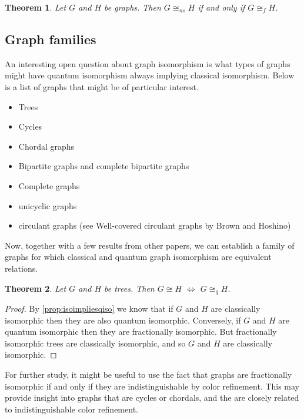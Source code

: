 \documentclass[12pt]{article}
\newtheorem{thm}{Theorem}[section]
\begin{document}
\begin{thm}
Let $G$ and $H$ be graphs. Then $G \cong_{ns} H$ if and only if $G \cong_f H$.
\end{thm}

\subsection{Graph families}
An interesting open question about graph isomorphism is what types of graphs might have quantum isomorphism always implying classical isomorphism. Below is a list of graphs that might be of particular interest.
\begin{itemize}
\item Trees
\item Cycles
\item Chordal graphs
\item Bipartite graphs and complete bipartite graphs
\item Complete graphs 
\item unicyclic graphs
\item circulant graphs (see Well-covered circulant graphs by Brown and Hoshino)
\end{itemize}
Now, together with a few results from other papers, we can establish a family of graphs for which classical and quantum graph isomorphism are equivalent relations.

\begin{thm}
\label{Trees}
Let $G$ and $H$ be trees. Then $G \cong H$ $\Leftrightarrow$ $G \cong_q H$.
\end{thm}
\begin{proof}
By \cref{prop:isoimpliesqiso} we know that if $G$ and $H$ are classically isomorphic then they are also quantum isomorphic. Conversely, if $G$ and $H$ are quantum isomorphic then they are fractionally isomorphic. But fractionally isomorphic trees are classically isomorphic, and so $G$ and $H$ are classically isomorphic.
\end{proof}

For further study, it might be useful to use the fact that graphs are fractionally isomorphic if and only if they are indistinguishable by color refinement. This may provide insight into graphs that are cycles or chordals, and the are closely related to indistinguishable color refinement.

\newpage



\end{document}
